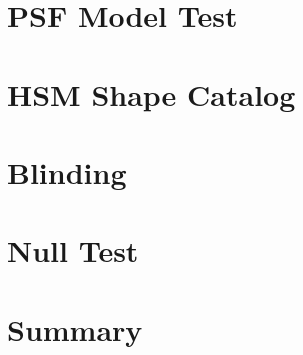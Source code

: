 \documentclass[useamsfonts]{pasj01}
\begin{document}
\section{PSF Model Test}
\label{sec:psftest}

\clearpage

\section{HSM Shape Catalog}

\clearpage

\section{Blinding}
\label{sec:blind}

\clearpage

\section{Null Test}
\label{sec:nullTest}

\clearpage

\section{Summary}
\label{sec:summary}
\clearpage




\appendix

\end{document}
